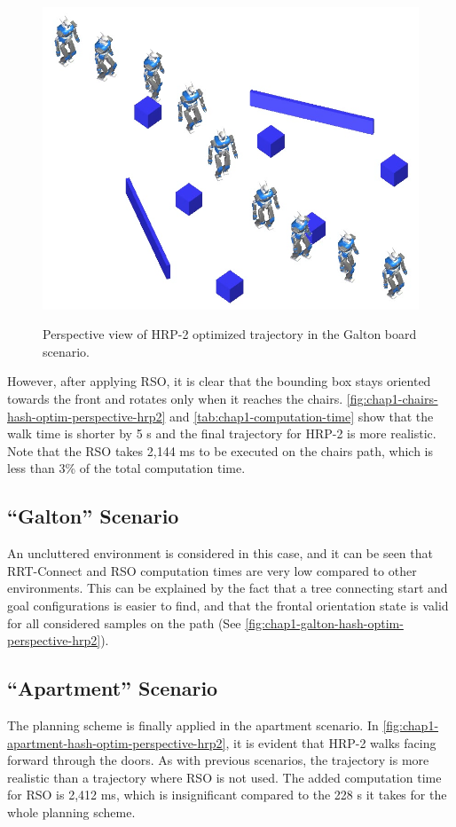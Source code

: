 \begin{figure}
  \centering
      {\includegraphics[width = \linewidth]
        {src/chap1-path-optimization/galton-hash-optim-perspective-hrp2.png}}
      \caption{Perspective view of HRP-2 optimized trajectory in the
        Galton board scenario.}
      \label{fig:chap1-galton-hash-optim-perspective-hrp2}
\end{figure}

However, after applying RSO, it is clear that the bounding box stays
oriented towards the front and rotates only when it reaches the
chairs. \autoref{fig:chap1-chairs-hash-optim-perspective-hrp2} and
\autoref{tab:chap1-computation-time} show that the walk time is shorter by 5
s and the final trajectory for HRP-2 is more realistic. Note that the
RSO takes 2,144 ms to be executed on the chairs path, which is less
than 3\% of the total computation time.

\subsection{``Galton'' Scenario}
An uncluttered environment is considered in this case, and
it can be seen that RRT-Connect and RSO computation times are very low
compared to other environments. This can be explained by the fact that
a tree connecting start and goal configurations is easier to find, and
that the frontal orientation state is valid for all considered samples
on the path (See \autoref{fig:chap1-galton-hash-optim-perspective-hrp2}).

\subsection{``Apartment'' Scenario}
The planning scheme is finally applied in the apartment scenario. In
\autoref{fig:chap1-apartment-hash-optim-perspective-hrp2}, it is
evident that HRP-2 walks facing forward through the doors. As with
previous scenarios, the trajectory is more realistic than a trajectory
where RSO is not used. The added computation time for RSO is 2,412 ms,
which is insignificant compared to the 228 s it takes for the whole
planning scheme.

